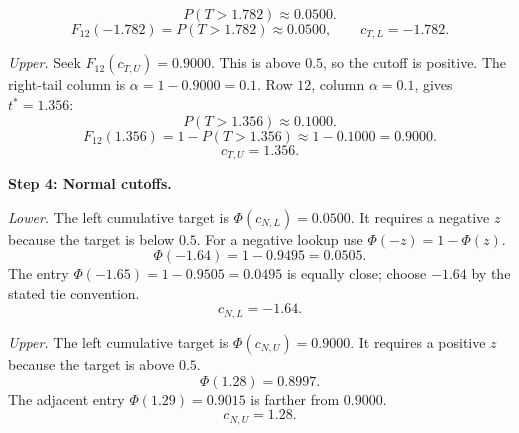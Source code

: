 \begin{enumerate}[leftmargin=*,label=\textbf{\arabic*.},itemsep=12pt,parsep=3pt,topsep=5pt]
\begin{minipage}{\linewidth}
\[P(T>1.782)\approx0.0500.
\]
\[
F_{12}(-1.782)=P(T>1.782)\approx0.0500,\qquad c_{T,L}=-1.782.
\]
\par\textit{Upper.} Seek $F_{12}(c_{T,U})=0.9000$. This is above $0.5$, so the cutoff is positive. The right-tail column is $\alpha=1-0.9000=0.1$. Row $12$, column $\alpha=0.1$, gives $t^*=1.356$:\[
P(T>1.356)\approx0.1000.
\]
\[
F_{12}(1.356)=1-P(T>1.356)\approx1-0.1000=0.9000.
\]
\[
c_{T,U}=1.356.
\]

\end{minipage}\par
\par\textbf{Step 4: Normal cutoffs.}\nopagebreak\enspace \par\noindent\begin{minipage}{\linewidth}
\par\textit{Lower.} The left cumulative target is $\Phi(c_{N,L})=0.0500$. It requires a negative $z$ because the target is below $0.5$. For a negative lookup use $\Phi(-z)=1-\Phi(z)$.\[
\Phi(-1.64)=1-0.9495=0.0505.
\]
The entry $\Phi(-1.65)=1-0.9505=0.0495$ is equally close; choose $-1.64$ by the stated tie convention.\[
c_{N,L}=-1.64.
\]
\end{minipage}\par
\par\noindent\begin{minipage}{\linewidth}
\par\textit{Upper.} The left cumulative target is $\Phi(c_{N,U})=0.9000$. It requires a positive $z$ because the target is above $0.5$.\[
\Phi(1.28)=0.8997.
\]
The adjacent entry $\Phi(1.29)=0.9015$ is farther from $0.9000$.\[
c_{N,U}=1.28.
\]
\end{minipage}\par


\end{enumerate}
